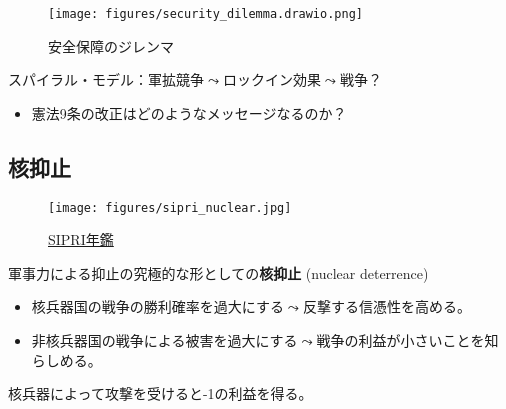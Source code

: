 \documentclass[
  xelatex,
  ja=standard]{bxjsarticle}
\providecommand{\tightlist}{%
  \setlength{\itemsep}{0pt}\setlength{\parskip}{0pt}}\usepackage{longtable,booktabs,array}
\begin{document}
\begin{figure}[htpb]

{\centering \texttt{[image: figures/security\_dilemma.drawio.png]}

}

\caption{安全保障のジレンマ}

\end{figure}

スパイラル・モデル：軍拡競争\(\leadsto\)ロックイン効果\(\leadsto\)戦争？

\begin{itemize}
\tightlist
\item
  憲法9条の改正はどのようなメッセージなるのか？
\end{itemize}

\hypertarget{ux6838ux6291ux6b62}{%
\subsection{核抑止}\label{ux6838ux6291ux6b62}}

\begin{figure}[htpb]

{\centering \texttt{[image: figures/sipri\_nuclear.jpg]}

}

\caption{\href{https://www.sipri.org/yearbook/2022/10}{SIPRI年鑑}}

\end{figure}

軍事力による抑止の究極的な形としての\textbf{核抑止} (nuclear deterrence)

\begin{itemize}
\tightlist
\item
  核兵器国の戦争の勝利確率を過大にする\(\leadsto\)反撃する信憑性を高める。
\item
  非核兵器国の戦争による被害を過大にする\(\leadsto\)戦争の利益が小さいことを知らしめる。
\end{itemize}

\begin{tcolorbox}[enhanced jigsaw, colback=white, leftrule=.75mm, bottomrule=.15mm, opacityback=0, opacitybacktitle=0.6, toptitle=1mm, bottomtitle=1mm, toprule=.15mm, coltitle=black, title=\textcolor{quarto-callout-tip-color}{\faLightbulb}\hspace{0.5em}{核による非核兵器国への抑止}, titlerule=0mm, colbacktitle=quarto-callout-tip-color!10!white, breakable, arc=.35mm, colframe=quarto-callout-tip-color-frame, rightrule=.15mm, left=2mm]

核兵器によって攻撃を受けると-1の利益を得る。

\end{tcolorbox}
\end{document}
